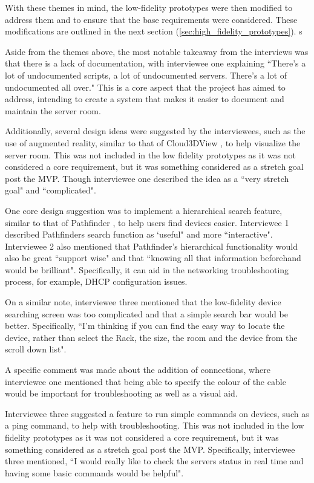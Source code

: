 \documentclass [11pt,a4paper]{article}
\begin{document}
With these themes in mind, the low-fidelity prototypes were then modified to address them and to ensure that the base requirements were considered. These modifications are outlined in the next section (\ref{sec:high_fidelity_prototypes}). s

Aside from the themes above, the most notable takeaway from the interviews was that there is a lack of documentation, with interviewee one explaining ``There's a lot of undocumented scripts, a lot of undocumented servers. There's a lot of undocumented all over." This is a core aspect that the project has aimed to address, intending to create a system that makes it easier to document and maintain the server room. 

Additionally, several design ideas were suggested by the interviewees, such as the use of augmented reality, similar to that of Cloud3DView \cite{cloud3dview}, to help visualize the server room. This was not included in the low fidelity prototypes as it was not considered a core requirement, but it was something considered as a stretch goal post the MVP. Though interviewee one described the idea as a ``very stretch goal" and ``complicated".

One core design suggestion was to implement a hierarchical search feature, similar to that of Pathfinder \cite{PathfinderMobile}, to help users find devices easier. Interviewee 1 described Pathfinders search function as `useful" and more ``interactive". Interviewee 2 also mentioned that Pathfinder's hierarchical functionality would also be great ``support wise" and that ``knowing all that information beforehand would be brilliant". Specifically, it can aid in the networking troubleshooting process, for example, DHCP configuration issues.

On a similar note, interviewee three mentioned that the low-fidelity device searching screen was too complicated and that a simple search bar would be better. Specifically, ``I'm thinking if you can find the easy way to locate the device, rather than select the Rack, the size, the room and the device from the scroll down list". 

A specific comment was made about the addition of connections, where interviewee one mentioned that being able to specify the colour of the cable would be important for troubleshooting as well as a visual aid.  

Interviewee three suggested a feature to run simple commands on devices, such as a ping command, to help with troubleshooting. This was not included in the low fidelity prototypes as it was not considered a core requirement, but it was something considered as a stretch goal post the MVP. Specifically, interviewee three mentioned, ``I would really like to check the servers status in real time and having some basic commands would be helpful".
\end{document}
